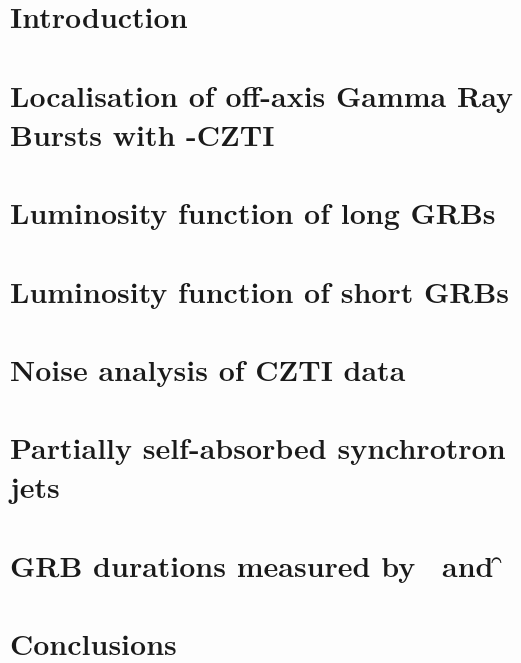 \documentclass[12pt, %
english, %
singlespacing, %
2%
headsepline, %
]{MastersDoctoralThesis} %
\begin{document}
\mainmatter
\pagestyle{thesis}


\chapter{Introduction}
\label{chap:introduction}


\chapter[Localisation of off-axis CZTI GRBs]{Localisation of off-axis Gamma Ray Bursts with \AS-CZTI}
\label{chap:localisation}

	
\chapter{Luminosity function of long GRBs}
\label{chap:LGRBs}


\chapter{Luminosity function of short GRBs}
\label{chap:SGRBs}


\chapter{Noise analysis of CZTI data}
\label{chap:noise}


\chapter{Partially self-absorbed synchrotron jets}
\label{chap:jet_model}


\chapter{GRB durations measured by \s\ and \f}
\label{chap:ongoing}


\chapter{Conclusions}
\label{chap:conclusions}






\appendix
\end{document}
